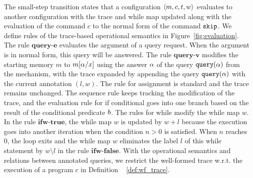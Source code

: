 \documentclass[a4paper,11pt]{article}
\begin{document}

The small-step transition states that a configuration $\langle m, c, t,w \rangle$ evaluates to another configuration with the trace and while map updated along with the evaluation of the command $c$ to the normal form of the command $\mathtt{skip}$.  
We define rules of the trace-based operational semantics in Figure~\ref{fig:evaluation}.
%
%
The rule $\textbf{query-e}$ evaluates the argument of a query request. When the argument is in normal form, this query will be answered.
%
The rule $\textbf{query-v}$ modifies the starting memory $m$ to $m[\alpha/x]$ using the answer $\alpha$ of the query ${\tt query}(\alpha)$ from the mechanism, 
with the trace expanded by appending the query ${\tt query}(\alpha)$ with the current annotation $(l,w)$. 
%
The rule for assignment is standard and the trace remains unchanged.%
The sequence rule keeps tracking the modification of the trace, and the evaluation rule for if conditional goes into one branch based on the result of the conditional predicate $b$. 
%
The rules for while modify the while map $w$. 
In the rule $\textbf{ifw-true}$, the while map $w$ is updated by $w + l$ because the execution goes into another iteration when the condition $n >0$ is satisfied. 
%
When $n$ reaches $0$, the loop exits and the while map $w$ eliminates the label $l$ of this while statement by $w \setminus l$ in the rule $\textbf{ifw-false}$.  
With the operational semantics and relations between annotated queries, we restrict the well-formed trace w.r.t. the execution of a program $c$ in Definition ~ \ref{def:wf_trace}.
%
\end{document}

